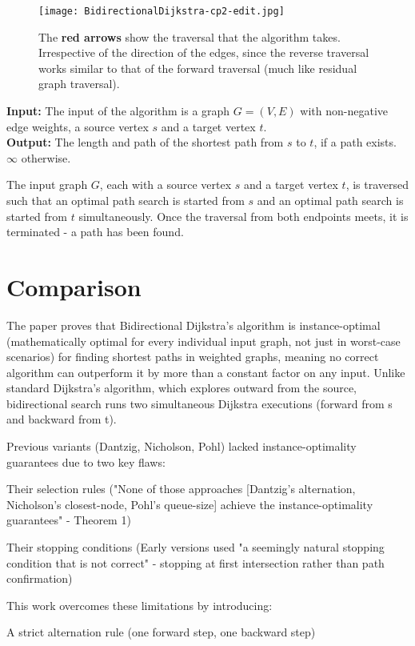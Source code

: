 \documentclass[12pt]{article}
\begin{document}
\begin{figure}[h]
\centering
\texttt{[image: BidirectionalDijkstra-cp2-edit.jpg]}
\caption{The \textbf{red arrows} show the traversal that the algorithm takes. Irrespective of the direction of the edges, since the reverse traversal works similar to that of the forward traversal (much like residual graph traversal).}
\end{figure}

\noindent\textbf{Input:} The input of the algorithm is a graph \( G = (V, E) \) with non-negative edge weights, a source vertex \( s \) and a target vertex \( t \). \\
\textbf{Output:} The length and path of the shortest path from \( s \) to \( t \), if a path exists. \( \infty \) otherwise.

The input graph \( G \), each with a source vertex \( s \) and a target vertex \( t \), is traversed such that an optimal path search is started from \( s \) and an optimal path search is started from \( t \) simultaneously. Once the traversal from both endpoints meets, it is terminated - a path has been found.

\section*{Comparison}
The paper proves that Bidirectional Dijkstra's algorithm is instance-optimal (mathematically optimal for every individual input graph, not just in worst-case scenarios) for finding shortest paths in weighted graphs, meaning no correct algorithm can outperform it by more than a constant factor on any input. Unlike standard Dijkstra's algorithm, which explores outward from the source, bidirectional search runs two simultaneous Dijkstra executions (forward from s and backward from t).

Previous variants (Dantzig, Nicholson, Pohl) lacked instance-optimality guarantees due to two key flaws:

Their selection rules ("None of those approaches [Dantzig's alternation, Nicholson's closest-node, Pohl's queue-size] achieve the instance-optimality guarantees" - Theorem 1)

Their stopping conditions (Early versions used "a seemingly natural stopping condition that is not correct" - stopping at first intersection rather than path confirmation)

This work overcomes these limitations by introducing:

A strict alternation rule (one forward step, one backward step)
\end{document}

